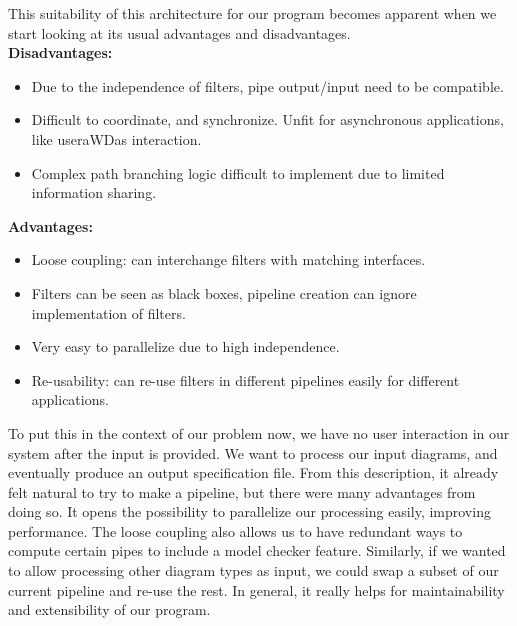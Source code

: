 \documentclass[11pt]{article}
\begin{document}
    This suitability of this architecture for our program becomes apparent when we start looking at its usual advantages and disadvantages.\\
    \textbf{Disadvantages:}
    \begin{itemize}
        \item Due to the independence of filters, pipe output/input need to be compatible.
        \item Difficult to coordinate, and synchronize.
        Unfit for asynchronous applications, like useraWDas interaction.
        \item Complex path branching logic difficult to implement due to limited information sharing.
    \end{itemize}
    \textbf{Advantages:}
    \begin{itemize}
        \item Loose coupling: can interchange filters with matching interfaces.
        \item Filters can be seen as black boxes, pipeline creation can ignore implementation of filters.
        \item Very easy to parallelize due to high independence.
        \item Re-usability: can re-use filters in different pipelines easily for different applications.
    \end{itemize}
    To put this in the context of our problem now, we have no user interaction in our system after the input is provided. We want to process our input diagrams, and eventually produce an output specification file. From this description, it already felt natural to try to make a pipeline, but there were many advantages from doing so. It opens the possibility to parallelize our processing easily, improving performance. The loose coupling also allows us to have redundant ways to compute certain pipes to include a model checker feature. Similarly, if we wanted to allow processing other diagram types as input, we could swap a subset of our current pipeline and re-use the rest. In general, it really helps for maintainability and extensibility of our program.
\end{document}

